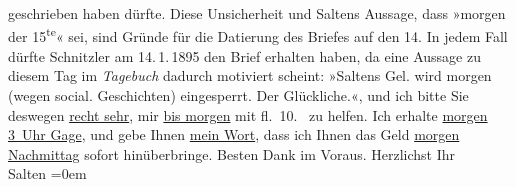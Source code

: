\begin{ledgroupsized}[t]{13cm}
{{{                  geschrieben haben dürfte. Diese Unsicherheit und Saltens Aussage, dass »morgen{ }der 15\textsuperscript{te}« sei, sind Gründe für die Datierung des Briefes auf den 14. In jedem Fall dürfte Schnitzler am 14. 1. 1895 den Brief erhalten haben, da eine
                  Aussage zu diesem Tag im \emph{Tagebuch} dadurch motiviert scheint: »Saltens Gel. wird morgen (wegen social. Geschichten) eingesperrt. Der
                     Glückliche.«}}}\label{K_L03148-2h}, und ich bitte Sie deswegen \uline{recht sehr}, mir \uline{bis morgen} mit fl. 10.~ zu helfen. Ich erhalte \uline{morgen{ }3 Uhr Gage}, und gebe Ihnen {\pb}\uline{mein Wort}, dass ich Ihnen das Geld \uline{morgen{ }Nachmittag} sofort hinüberbringe.\pend
           \pstart
           Besten Dank im Voraus. Herzlichst Ihr {\\[\baselineskip]}\spacefill\mbox{Salten}\pend
           \leftskip=0em{}
         
         \endnumbering{}\end{ledgroupsized}  \newcommand{\dateiname}{L03148}\newcommand{\titel}{Felix Salten an Arthur Schnitzler, [14?. 1. 1895]}\newcommand{\editorInnen}{Martin Anton Müller und Laura Untner}
      